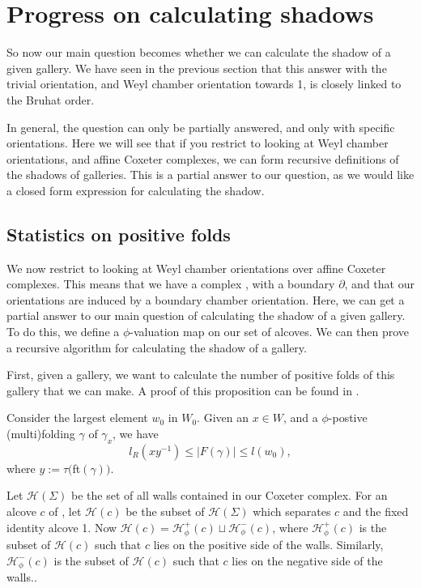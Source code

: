 \documentclass[11pt]{article}
\begin{document}
\section{Progress on calculating shadows}

So now our main question becomes whether we can calculate the shadow of a given gallery. We have seen in the previous section that this answer with the trivial orientation, and Weyl chamber orientation towards 1, is closely linked to the Bruhat order. 

In general, the question can only be partially answered, and only with specific orientations. Here we will see that if you restrict to looking at Weyl chamber orientations, and affine Coxeter complexes, we can form recursive definitions of the shadows of galleries. This is a partial answer to our question, as we would like a closed form expression for calculating the shadow. 

\subsection{Statistics on positive folds}

We now restrict to looking at Weyl chamber orientations over affine Coxeter complexes. This means that we have a complex \sg, with a boundary $\partial$\sg, and that our orientations are induced by a boundary chamber orientation. Here, we can get a partial answer to our main question of calculating the shadow of a given gallery. To do this, we define a $\phi$-valuation map on our set of alcoves. We can then prove a recursive algorithm for calculating the shadow of a gallery.

First, given a gallery, we want to calculate the number of positive folds of this gallery that we can make. A proof of this proposition can be found in \cite{DEL}.

\begin{proposition}
    Consider the largest element $w_0$ in $W_0$. Given an $x\in W$, and a $\phi$-postive (multi)folding $\gamma$ of $\gamma_x$, we have
    \[l_R(xy^{-1})\leq |F(\gamma)|\leq l(w_0),\]
    where $y:=\tau($ft$(\gamma))$.
\end{proposition}


\begin{definition}
    Let $\mathcal{H}(\Sigma)$ be the set of all walls contained in our Coxeter complex. For an alcove $c$ of \sg, let $\mathcal{H}(c)$ be the subset of $\mathcal{H}(\Sigma)$ which separates $c$ and the fixed identity alcove 1. Now $\mathcal{H}(c)=\mathcal{H}_{\phi}^+(c)\sqcup \mathcal{H}_{\phi}^-(c)$, where $\mathcal{H}_{\phi}^+(c)$ is the subset of $\mathcal{H}(c)$ such that $c$ lies on the positive side of the walls. Similarly, $\mathcal{H}_{\phi}^-(c)$ is the subset of $\mathcal{H}(c)$ such that $c$ lies on the negative side of the walls..
\end{definition}
\end{document}
